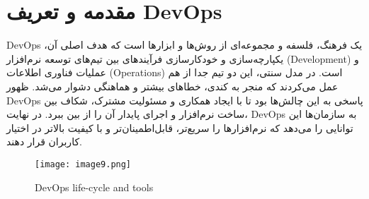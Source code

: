 \section{مقدمه و تعریف DevOps}
DevOps یک فرهنگ، فلسفه و مجموعه‌ای از روش‌ها و ابزارها است که هدف اصلی آن، یکپارچه‌سازی و خودکارسازی فرآیندهای بین تیم‌های توسعه نرم‌افزار (Development) و عملیات فناوری اطلاعات (Operations) است. در مدل سنتی، این دو تیم جدا از هم عمل می‌کردند که منجر به کندی، خطاهای بیشتر و هماهنگی دشوار می‌شد. ظهور DevOps پاسخی به این چالش‌ها بود تا با ایجاد همکاری و مسئولیت مشترک، شکاف بین ساخت نرم‌افزار و اجرای پایدار آن را از بین ببرد. در نهایت، DevOps به سازمان‌ها این توانایی را می‌دهد که نرم‌افزارها را سریع‌تر، قابل‌اطمینان‌تر و با کیفیت بالاتر در اختیار کاربران قرار دهند.

\begin{figure}[h]
\centering
\texttt{[image: image9.png]}
\caption{DevOps life-cycle and tools}
\label{fig:DevOps life-cycle and tools}
\end{figure}

